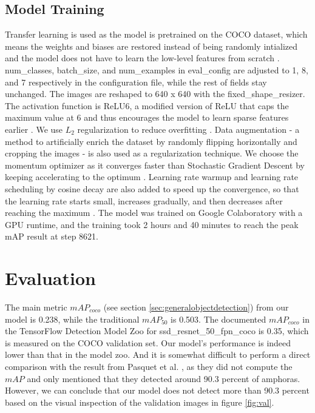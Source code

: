 \documentclass[a4paper, 11pt, oneside]{article}
\begin{document}
  \subsection{Model Training}

  Transfer learning \cite{torrey2010transfer} is used as the model is pretrained on the COCO dataset, which means the
  weights and biases are restored instead of being randomly intialized and the model does not have to learn the low-level
  features from scratch \cite{geron2019hands}. num\_classes, batch\_size, and num\_examples in eval\_config are adjusted
  to 1, 8, and 7 respectively in the configuration file, while the rest of fields stay unchanged. The images are reshaped
  to 640 x 640 with the fixed\_shape\_resizer. The activation function is ReLU6, a modified version of ReLU that caps
  the maximum value at 6 and thus encourages the model to learn sparse features earlier
  \cite{krizhevsky2010convolutional}. We use $L_2$ regularization \cite{ng2004feature} to reduce overfitting
  \cite{hawkins2004problem}. Data augmentation \cite{geron2019hands, krizhevsky2012imagenet} - a method to artificially
  enrich the dataset by randomly flipping horizontally and cropping the images - is also used as a regularization technique.
  We choose the momentum optimizer \cite{polyak1964some} as it converges faster than Stochastic Gradient Descent
  \cite{bottou2010large} by keeping accelerating to the optimum \cite{geron2019hands}. Learning rate warmup and learning
  rate scheduling by cosine decay are also added to speed up the convergence, so that the learning rate starts small,
  increases gradually, and then decreases after reaching the maximum
  \cite{geron2019hands, goyal2017accurate, senior2013empirical, loshchilov2016sgdr}.
  The model was trained on Google Colaboratory \cite{colab} with a GPU runtime, and the training took 2 hours and 40
  minutes to reach the peak mAP result at step 8621.

  \section{Evaluation}

  The main metric $mAP_{coco}$ (see section \ref{sec:generalobjectdetection}) from our model is 0.238, while the
  traditional $mAP_{50}$ is 0.503. The documented $mAP_{coco}$ in the TensorFlow Detection Model Zoo for
  ssd\_resnet\_50\_fpn\_coco is 0.35, which is measured on the COCO validation set. Our model's performance is indeed
  lower than that in the model zoo. And it is somewhat difficult to perform a direct comparison with the result from
  Pasquet et al. \cite{pasquet2017amphora}, as they did not compute the $mAP$ and only mentioned that they detected
  around 90.3 percent of amphoras. However, we can conclude that our model does not detect more than 90.3 percent based
  on the visual inspection of the validation images in figure \ref{fig:val}.
\end{document}
